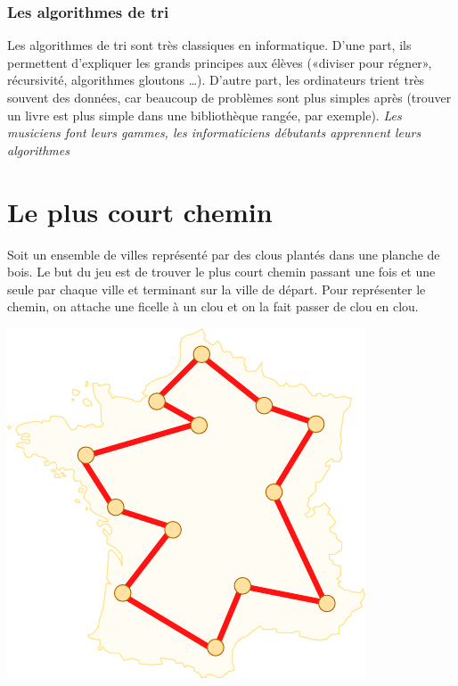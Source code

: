 \documentclass[a5paper,pagesize,DIV=14]{scrbook}
\begin{document}
\subsection*{Les algorithmes de tri}

Les algorithmes de tri sont très classiques en informatique. D'une part, ils permettent d'expliquer les grands principes aux élèves («diviser pour régner», récursivité, algorithmes gloutons \ldots). D'autre part, les ordinateurs trient très souvent des données, car beaucoup de problèmes sont plus simples après (trouver un livre est plus simple dans une bibliothèque rangée, par exemple). \textit{Les musiciens font leurs gammes, les informaticiens débutants apprennent leurs algorithmes}



\chapter*{Le plus court chemin}

Soit un ensemble de villes représenté par des clous plantés dans une planche de bois. Le but du jeu est de trouver le plus court chemin passant une fois et une seule par chaque ville et terminant sur la ville de départ. Pour représenter le chemin, on attache une ficelle à un clou et on la fait passer de clou en clou.

\begin{center}
  \includegraphics[width=0.5\linewidth]{img/tsp.pdf}
  \label{img:tsp}
\end{center}
\end{document}
